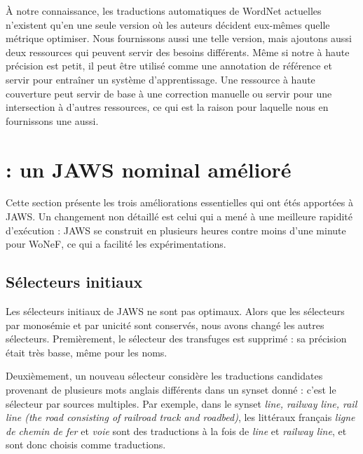 À notre connaissance, les traductions automatiques de WordNet actuelles n'existent qu'en une seule version où les auteurs décident eux-mêmes quelle métrique optimiser. Nous fournissons aussi une telle version, mais ajoutons aussi deux ressources qui peuvent servir des besoins différents. Même si notre \newjaws{} à haute précision est petit, il peut être utilisé comme une annotation de référence et servir pour entraîner un système d'apprentissage. Une ressource à haute couverture peut servir de base à une correction manuelle ou servir pour une intersection à d'autres ressources, ce qui est la raison pour laquelle nous en fournissons une aussi.

\section{\newjaws{}: un JAWS nominal amélioré}
\label{sec:improving_jaws}

Cette section présente les trois améliorations essentielles qui ont étés apportées à JAWS. Un changement non détaillé est celui qui a mené à une meilleure rapidité d'exécution : JAWS se construit en plusieurs heures contre moins d'une minute pour WoNeF, ce qui a facilité les expérimentations.

\subsection{Sélecteurs initiaux}
\label{subsec:revisiting_extraction_heuristics}


Les sélecteurs initiaux de JAWS ne sont pas optimaux. Alors que les sélecteurs par monosémie et par unicité sont conservés, nous avons changé les autres sélecteurs. Premièrement, le sélecteur des transfuges est supprimé : sa précision était très basse, même pour les noms.

Deuxièmement, un nouveau sélecteur considère les traductions candidates provenant de plusieurs mots anglais différents dans un synset donné : c'est le sélecteur par sources multiples. Par exemple, dans le synset \textit{line, railway line, rail line (the road consisting of railroad track and roadbed)}, les littéraux français \textit{ligne de chemin de fer} et \textit{voie} sont des traductions à la fois de \textit{line} et \textit{railway line}, et sont donc choisis comme traductions.


